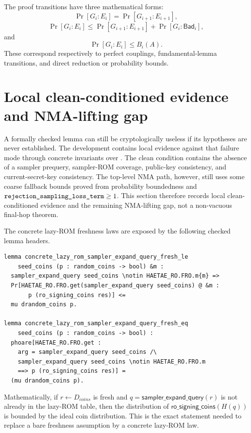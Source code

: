 The proof transitions have three mathematical forms:
\[
  \Pr[G_i:E_i]=\Pr[G_{i+1}:E_{i+1}],
\]
\[
  \Pr[G_i:E_i]\le \Pr[G_{i+1}:E_{i+1}]+\Pr[G_i:\mathsf{Bad}_i],
\]
and
\[
  \Pr[G_i:E_i]\le B_i(A).
\]
These correspond respectively to perfect couplings, fundamental-lemma
transitions, and direct reduction or probability bounds.

\section{Local clean-conditioned evidence and NMA-lifting gap}
\label{sec:synthesis-nonvacuity-final}

A formally checked lemma can still be cryptologically useless if its hypotheses
are never established.  The development contains local evidence against that
failure mode through concrete invariants over
.  The clean condition
contains the absence of a sampler prequery, sampler-ROM coverage, public-key
consistency, and current-secret-key consistency.  The top-level NMA path,
however, still uses some coarse fallback bounds proved from probability
boundedness and \(\texttt{rejection\_sampling\_loss\_term}\ge 1\).  This section
therefore records local clean-conditioned evidence and the remaining
NMA-lifting gap, not a non-vacuous final-hop theorem.

The concrete lazy-ROM freshness laws are exposed by the following checked lemma
headers.

\begin{lstlisting}[language=EasyCrypt,caption={Concrete lazy-ROM sampler freshness laws.},label={lst:concrete-lazy-rom-freshness-laws}]
lemma concrete_lazy_rom_sampler_expand_query_fresh_le
    seed_coins (p : random_coins -> bool) &m :
  sampler_expand_query seed_coins \notin HAETAE_RO.FRO.m{m} =>
  Pr[HAETAE_RO.FRO.get(sampler_expand_query seed_coins) @ &m :
       p (ro_signing_coins res)] <=
  mu drandom_coins p.

lemma concrete_lazy_rom_sampler_expand_query_fresh_eq
    seed_coins (p : random_coins -> bool) :
  phoare[HAETAE_RO.FRO.get :
    arg = sampler_expand_query seed_coins /\
    sampler_expand_query seed_coins \notin HAETAE_RO.FRO.m
    ==> p (ro_signing_coins res)] =
  (mu drandom_coins p).
\end{lstlisting}

Mathematically, if \(r\leftarrow D_{coins}\) is fresh and
\(q=\mathsf{sampler\_expand\_query}(r)\) is not already in the lazy-ROM table,
then the distribution of \(\mathsf{ro\_signing\_coins}(H(q))\) is bounded by the
ideal coin distribution.  This is the exact statement needed to replace a bare
freshness assumption by a concrete lazy-ROM law.

